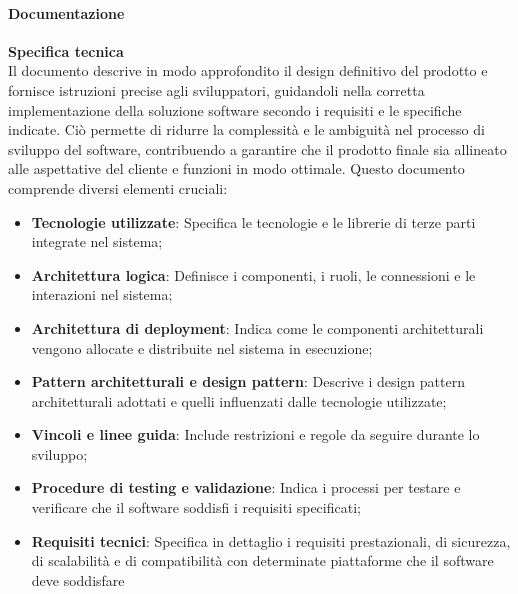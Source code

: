 \paragraph{Documentazione}
\textbf{Specifica tecnica} \\
Il documento descrive in modo approfondito il design definitivo del prodotto e fornisce istruzioni precise agli sviluppatori, guidandoli nella corretta implementazione della soluzione software secondo i requisiti e le specifiche indicate. Ciò permette di ridurre la complessità e le ambiguità nel processo di sviluppo del software, contribuendo a garantire che il prodotto finale sia allineato alle aspettative del cliente e funzioni in modo ottimale.
Questo documento comprende diversi elementi cruciali: 
\begin{itemize}
    \item \textbf{Tecnologie utilizzate}: Specifica le tecnologie e le librerie di terze parti integrate nel sistema;
    \item \textbf{Architettura logica}: Definisce i componenti, i ruoli, le connessioni e le interazioni nel sistema;
    \item \textbf{Architettura di deployment}: Indica come le componenti architetturali vengono allocate e distribuite nel sistema in esecuzione;
    \item \textbf{Pattern architetturali e design pattern}: Descrive i design pattern architetturali adottati e quelli influenzati dalle tecnologie utilizzate;
    \item \textbf{Vincoli e linee guida}: Include restrizioni e regole da seguire durante lo sviluppo;
    \item \textbf{Procedure di testing e validazione}: Indica i processi per testare e verificare che il software soddisfi i requisiti specificati;
    \item \textbf{Requisiti tecnici}: Specifica in dettaglio i requisiti prestazionali, di sicurezza, di scalabilità e di compatibilità con determinate piattaforme che il software deve soddisfare
\end{itemize}

